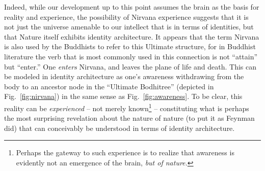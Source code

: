 \documentclass[pra,twocolumn,groupedaddress,10pt]{revtex4}
\theoremstyle{definition}
\begin{document}
Indeed, while our development up to this point assumes the brain as the basis for reality and experience, the possibility of Nirvana experience suggests that it is not just the universe amenable to our intellect that is in terms of identities, but that Nature itself exhibits identity architecture. It appears that the term Nirvana is also used by the Buddhists to refer to this Ultimate structure, for in Buddhist literature the verb that is most commonly used in this connection is not ``attain'' but ``enter.'' One \textit{enters} Nirvana, and leaves the plane of life and death. This can be modeled in identity architecture as one's awareness withdrawing from the body to an ancestor node in the ``Ultimate Bodhitree'' (depicted in Fig.~\ref{fig:nirvana}) in the same sense as Fig.~\ref{fig:awareness}. To be clear, this reality can be \textit{experienced} -- not merely known\footnote{Perhaps the gateway to such experience is to realize that awareness is evidently not an emergence of the brain, \textit{but of nature.}} -- constituting what is perhaps the most surprising revelation about the nature of nature (to put it as Feynman did) that can conceivably be understood in terms of identity architecture.
\end{document}
